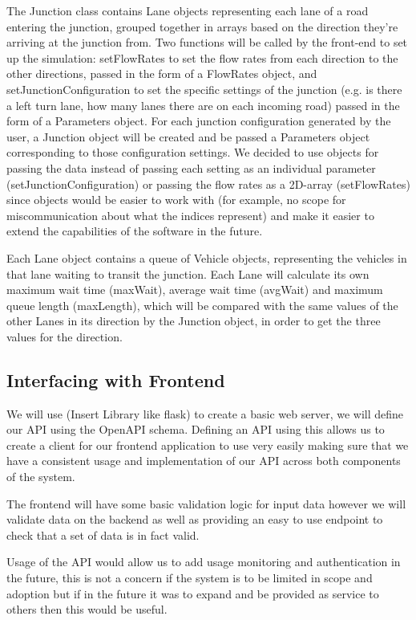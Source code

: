 \documentclass{article}
\begin{document}
The Junction class contains Lane objects representing each lane of a road entering the junction, grouped together in arrays based on 
the direction they’re arriving at the junction from. Two functions will be called by the front-end to set up the simulation: setFlowRates 
to set the flow rates from each direction to the other directions, passed in the form of a FlowRates object, and setJunctionConfiguration 
to set the specific settings of the junction (e.g. is there a left turn lane, how many lanes there are on each incoming road) passed in 
the form of a Parameters object. For each junction configuration generated by the user, a Junction object will be created and be passed 
a Parameters object corresponding to those configuration settings. We decided to use objects for passing the data instead of passing each 
setting as an individual parameter (setJunctionConfiguration) or passing the flow rates as a 2D-array (setFlowRates) since objects would 
be easier to work with (for example, no scope for miscommunication about what the indices represent) and make it easier to extend the 
capabilities of the software in the future.

Each Lane object contains a queue of Vehicle objects, representing the vehicles in that lane waiting to transit the junction. Each Lane 
will calculate its own maximum wait time (maxWait), average wait time (avgWait) and maximum queue length (maxLength), which will be 
compared with the same values of the other Lanes in its direction by the Junction object, in order to get the three values for the direction.

\subsection{Interfacing with Frontend}

We will use (Insert Library like flask) to create a basic web server, we will define 
our API using the OpenAPI schema. Defining an API using this allows us to create a 
client for our frontend application to use very easily making sure that we have a 
consistent usage and implementation of our API across both components of the system. 

The frontend will have some basic validation logic for input data however we will  
validate data on the backend as well as providing an easy to use endpoint to check that 
a set of data is in fact valid. 

Usage of the API would allow us to add usage monitoring and authentication in the future, 
this is not a concern if the system is to be limited in scope and adoption but if in the 
future it was to expand and be provided as service to others then this would be useful.
\end{document}
